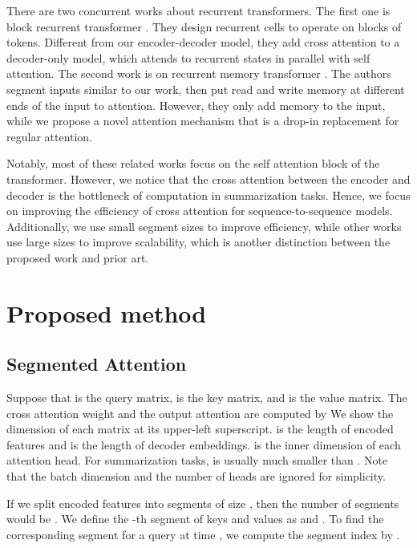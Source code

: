 \documentclass[11pt]{article}
\begin{document}
There are two concurrent works about recurrent transformers. The first one is block recurrent transformer \cite{Hutchins2022BlockRecurrentT}. They design recurrent cells to operate on blocks of tokens. Different from our encoder-decoder model, they add cross attention to a decoder-only model, which attends to recurrent states in parallel with self attention. The second work is on recurrent memory transformer \cite{bulatov2022recurrent}. The authors segment inputs similar to our work, then put read and write memory at different ends of the input to attention. However, they only add memory to the input, while we propose a novel attention mechanism that is a drop-in replacement for regular attention.


 Notably, most of these related works focus on the self attention block of the transformer. However, we notice that the cross attention between the encoder and decoder is the bottleneck of computation in summarization tasks. Hence, we focus on improving the efficiency of cross attention for sequence-to-sequence models. Additionally, we use small segment sizes to improve efficiency, while other works use large sizes to improve scalability, which is another distinction between the proposed work and prior art.










\section{Proposed method}

\subsection{Segmented Attention}
Suppose that  is the query matrix,  is the key matrix, and  is the value matrix. The cross attention weight  and the output attention  are computed by 
We show the dimension of each matrix at its upper-left superscript.  is the length of encoded features and  is the length of decoder embeddings.  is the inner dimension of each attention head. For summarization tasks,  is usually much smaller than . Note that the  batch dimension and the number of heads are ignored for simplicity.

If we split encoded features into segments of size , then the number of segments would be .  We define the -th segment of keys and values as  and  . To find the corresponding segment for a query at time , we compute the segment index by .
\end{document}
